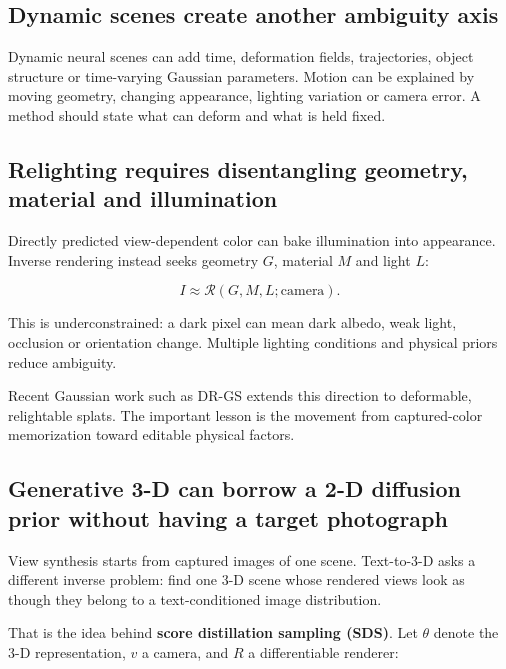 \subsection{Dynamic scenes create another ambiguity axis}\label{04-visual-computing-ii-ch035-dynamic-scenes-create-another-ambiguity-axis}

Dynamic neural scenes can add time, deformation fields, trajectories, object structure or time-varying Gaussian parameters. Motion can be explained by moving geometry, changing appearance, lighting variation or camera error. A method should state what can deform and what is held fixed.

\subsection{Relighting requires disentangling geometry, material and illumination}\label{04-visual-computing-ii-ch035-relighting-requires-disentangling-geometry-material-and-illumination}

Directly predicted view-dependent color can bake illumination into appearance. Inverse rendering instead seeks geometry \(G\), material \(M\) and light \(L\):

\[
I\approx\mathcal R(G,M,L;\text{camera}).
\]

This is underconstrained: a dark pixel can mean dark albedo, weak light, occlusion or orientation change. Multiple lighting conditions and physical priors reduce ambiguity.

Recent Gaussian work such as DR-GS extends this direction to deformable, relightable splats. The important lesson is the movement from captured-color memorization toward editable physical factors.

\subsection{Generative 3-D can borrow a 2-D diffusion prior without having a target photograph}\label{04-visual-computing-ii-ch035-generative-3-d-can-borrow-a-2-d-diffusion-prior-without-having-a-target-photograph}

View synthesis starts from captured images of one scene. Text-to-3-D asks a different inverse problem: find one 3-D scene whose rendered views look as though they belong to a text-conditioned image distribution.

That is the idea behind \textbf{score distillation sampling (SDS)}. Let \(\theta\) denote the 3-D representation, \(v\) a camera, and \(R\) a differentiable renderer:

